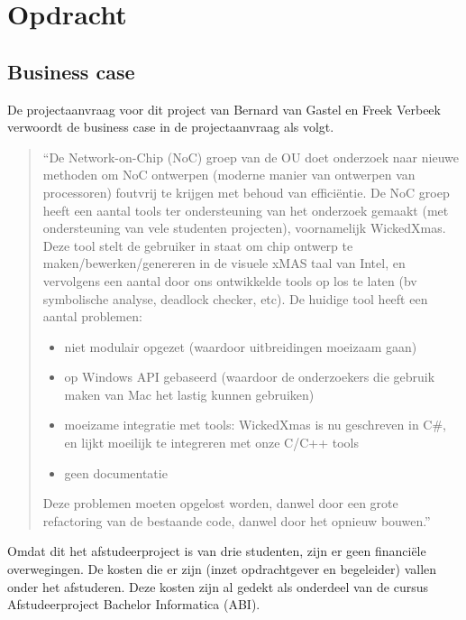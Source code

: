 
\section{Opdracht}

\subsection{Business case}

De projectaanvraag voor dit project van Bernard van Gastel en
Freek Verbeek verwoordt de business case in de projectaanvraag
als volgt.

\begin{quote}
    \small\sf
    ``De Network-on-Chip (NoC) groep van de OU doet onderzoek
    naar nieuwe methoden om NoC ontwerpen (moderne manier van
    ontwerpen van processoren) foutvrij te krijgen met behoud van
    efficiëntie. De NoC groep heeft een aantal tools ter ondersteuning
    van het onderzoek gemaakt (met ondersteuning van vele studenten
    projecten), voornamelijk WickedXmas. Deze tool stelt de
    gebruiker in staat om chip ontwerp te maken/bewerken/genereren
    in de visuele xMAS taal van Intel, en vervolgens een aantal door
    ons ontwikkelde tools op los te laten (bv symbolische analyse,
    deadlock checker, etc).
    De huidige tool heeft een aantal problemen:

    \begin{itemize}
	\item niet modulair opgezet (waardoor uitbreidingen moeizaam gaan)
	\item op Windows API gebaseerd (waardoor de onderzoekers die
	    gebruik maken van Mac het lastig kunnen gebruiken)
	\item moeizame integratie met tools: WickedXmas is nu geschreven
	    in C\#, en lijkt moeilijk te integreren met onze C/C++ tools
	\item geen documentatie
    \end{itemize}

    Deze problemen moeten opgelost worden, danwel door een grote
    refactoring van de bestaande code, danwel door het opnieuw
    bouwen.''
\end{quote}

Omdat dit het afstudeerproject is van drie studenten, zijn er geen financi\"ele overwegingen.
De kosten die er zijn (inzet opdrachtgever en begeleider) vallen onder het afstuderen. Deze kosten
zijn al gedekt als onderdeel van de cursus Afstudeerproject Bachelor Informatica (ABI).

